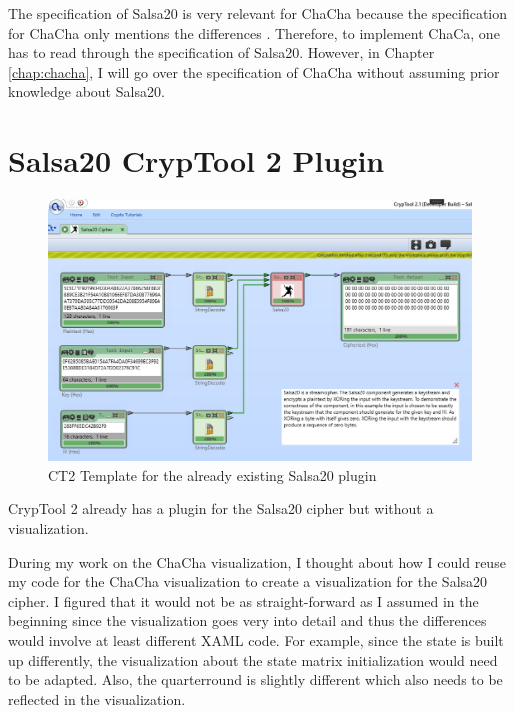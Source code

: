 The specification of Salsa20 is very relevant for ChaCha because the specification for ChaCha only mentions the differences \cite{chachaspec}. Therefore, to implement ChaCa, one has to read through the specification of Salsa20.  However, in Chapter \ref{chap:chacha}, I will go over the specification of ChaCha without assuming prior knowledge about Salsa20.


\section{Salsa20 CrypTool 2 Plugin}
\label{sec:salsaCT2Plugin}

\begin{figure}
\caption[Salsa20 CT2 Template]{CT2 Template for the already existing Salsa20 plugin}
\label{fig:salsa.template}
\centering
\includegraphics[width=\textwidth]{figures/ct2/salsa-crop.png}
\end{figure}

CrypTool 2 already has a plugin for the Salsa20 cipher but without a visualization.

During my work on the ChaCha visualization, I thought about how I could reuse my code for the ChaCha visualization to create a visualization for the Salsa20 cipher. I figured that it would not be as straight-forward as I assumed in the beginning since the visualization goes very into detail and thus the differences would involve at least different XAML code. For example, since the state is built up differently, the visualization about the state matrix initialization would need to be adapted. Also, the quarterround is slightly different which also needs to be reflected in the visualization. 

